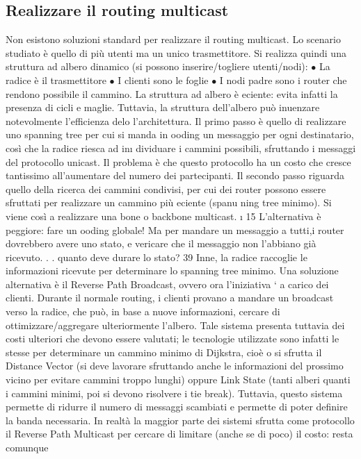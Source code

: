 \subsection{Realizzare il routing multicast}
Non esistono soluzioni standard per realizzare il routing multicast. Lo scenario
studiato è quello di più utenti ma un unico trasmettitore. Si realizza quindi una
struttura ad albero dinamico (si possono inserire/togliere utenti/nodi):
$\bullet$ La radice è il trasmettitore
$\bullet$ I clienti sono le foglie
$\bullet$ I nodi padre sono i router che rendono possibile il cammino.
La struttura ad albero è eciente: evita infatti la presenza di cicli e maglie.
Tuttavia, la struttura dell'albero può inuenzare notevolmente l'efficienza delo
l'architettura.
Il primo passo è quello di realizzare uno spanning tree per cui si manda
in ooding un messaggio per ogni destinatario, così che la radice riesca ad in\i{}
dividuare i cammini possibili, sfruttando i messaggi del protocollo unicast. Il
problema è che questo protocollo ha un costo che cresce tantissimo all'aumentare
del numero dei partecipanti.
Il secondo passo riguarda quello della ricerca dei cammini condivisi, per cui
dei router possono essere sfruttati per realizzare un cammino più eciente (spanu
ning tree minimo). Si viene così a realizzare una bone o backbone multicast.
\i{}
15 L'alternativa è peggiore: fare un ooding globale! Ma per mandare un messaggio a
tutti,i router dovrebbero avere uno stato, e vericare che il messaggio non l'abbiano già
ricevuto. . . quanto deve durare lo stato?
39
Inne, la radice raccoglie le informazioni ricevute per determinare lo spanning
tree minimo.
Una soluzione alternativa è il Reverse Path Broadcast, ovvero ora l'iniziativa
` a carico dei clienti. Durante il normale routing, i clienti provano a mandare
un broadcast verso la radice, che può, in base a nuove informazioni, cercare
di ottimizzare/aggregare ulteriormente l'albero. Tale sistema presenta tuttavia
dei costi ulteriori che devono essere valutati; le tecnologie utilizzate sono infatti
le stesse per determinare un cammino minimo di Dijkstra, cioè o si sfrutta il
Distance Vector (si deve lavorare sfruttando anche le informazioni del prossimo
vicino per evitare cammini troppo lunghi) oppure Link State (tanti alberi quanti
i cammini minimi, poi si devono risolvere i tie break). Tuttavia, questo sistema
permette di ridurre il numero di messaggi scambiati e permette di poter definire
la banda necessaria.
In realtà la maggior parte dei sistemi sfrutta come protocollo il Reverse Path
Multicast per cercare di limitare (anche se di poco) il costo: resta comunque
